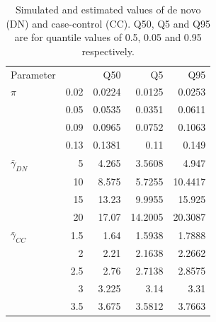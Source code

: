 \documentclass[]{article}
\begin{document}
\begin{table}[H]
\begin{tabular}{l|r|r|r|r}
\hline

Parameter & & Q50 & Q5 & Q95 \\
$\pi$ & 0.02 & 0.0224 & 0.0125 & 0.0253\\
& 0.05 & 0.0535 & 0.0351 & 0.0611\\
& 0.09 & 0.0965 & 0.0752 & 0.1063\\
& 0.13 & 0.1381 & 0.11 & 0.149\\
\hline
$\bar{\gamma}_{DN}$ & 5 & 4.265 & 3.5608 & 4.947\\
& 10 & 8.575 & 5.7255 & 10.4417\\
& 15 & 13.23 & 9.9955 & 15.925\\
& 20 & 17.07 & 14.2005 & 20.3087\\
\hline
$\bar{\gamma}_{CC}$ & 1.5 & 1.64 & 1.5938 & 1.7888\\
& 2 & 2.21 & 2.1638 & 2.2662\\
& 2.5 & 2.76 & 2.7138 & 2.8575\\
& 3 & 3.225 & 3.14 & 3.31\\
& 3.5 & 3.675 & 3.5812 & 3.7663\\
\hline
\end{tabular}
\caption{Simulated and estimated values of de novo (DN) and
  case-control (CC). Q50, Q5 and Q95 are for quantile values of 0.5,
  0.05 and 0.95 respectively.}
\label{tab:SimulatedParameterOfDNandCC}
\end{table}

\end{document}
